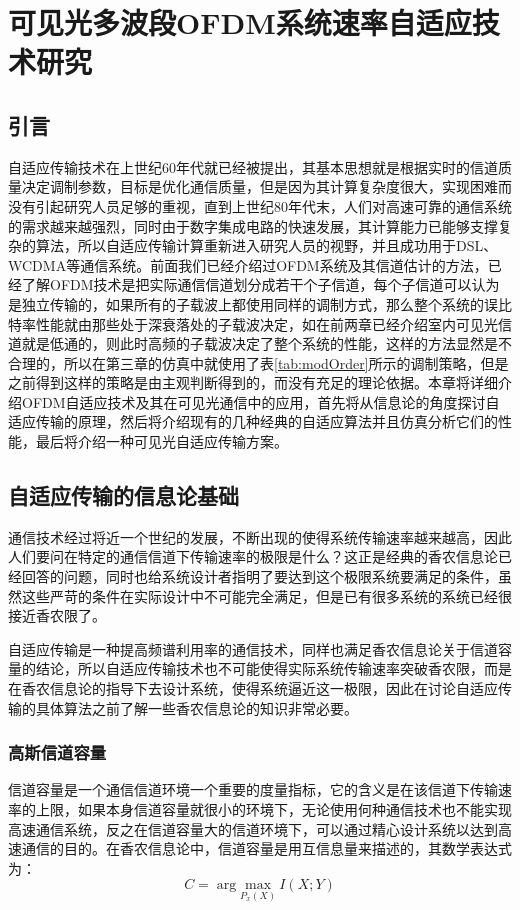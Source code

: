 \chapter{可见光多波段OFDM系统速率自适应技术研究}
\section{引言}
自适应传输技术在上世纪60年代就已经被提出，其基本思想就是根据实时的信道质量决定调制参数，目标是优化通信质量，但是因为其计算复杂度很大，实现困难而没有引起研究人员足够的重视\cite{徐凌峰2007ofdm}，直到上世纪80年代末，人们对高速可靠的通信系统的需求越来越强烈，同时由于数字集成电路的快速发展，其计算能力已能够支撑复杂的算法，所以自适应传输计算重新进入研究人员的视野，并且成功用于DSL、WCDMA等通信系统。前面我们已经介绍过OFDM系统及其信道估计的方法，已经了解OFDM技术是把实际通信信道划分成若干个子信道，每个子信道可以认为是独立传输的，如果所有的子载波上都使用同样的调制方式，那么整个系统的误比特率性能就由那些处于深衰落处的子载波决定，如在前两章已经介绍室内可见光信道就是低通的，则此时高频的子载波决定了整个系统的性能，这样的方法显然是不合理的，所以在第三章的仿真中就使用了表\ref{tab:modOrder}所示的调制策略，但是之前得到这样的策略是由主观判断得到的，而没有充足的理论依据。本章将详细介绍OFDM自适应技术及其在可见光通信中的应用，首先将从信息论的角度探讨自适应传输的原理，然后将介绍现有的几种经典的自适应算法并且仿真分析它们的性能，最后将介绍一种可见光自适应传输方案。
\section{自适应传输的信息论基础}
通信技术经过将近一个世纪的发展，不断出现的使得系统传输速率越来越高，因此人们要问在特定的通信信道下传输速率的极限是什么？这正是经典的香农信息论已经回答的问题，同时也给系统设计者指明了要达到这个极限系统要满足的条件，虽然这些严苛的条件在实际设计中不可能完全满足，但是已有很多系统的系统已经很接近香农限了。

自适应传输是一种提高频谱利用率的通信技术，同样也满足香农信息论关于信道容量的结论，所以自适应传输技术也不可能使得实际系统传输速率突破香农限，而是在香农信息论的指导下去设计系统，使得系统逼近这一极限，因此在讨论自适应传输的具体算法之前了解一些香农信息论的知识非常必要。
\subsection{高斯信道容量}
信道容量是一个通信信道环境一个重要的度量指标，它的含义是在该信道下传输速率的上限，如果本身信道容量就很小的环境下，无论使用何种通信技术也不能实现高速通信系统，反之在信道容量大的信道环境下，可以通过精心设计系统以达到高速通信的目的。在香农信息论中，信道容量是用互信息量来描述的，其数学表达式为：
\begin{equation}
C = \arg \underset{P_x(X)}{\text{max}} \ I(X;Y)
\end{equation}

